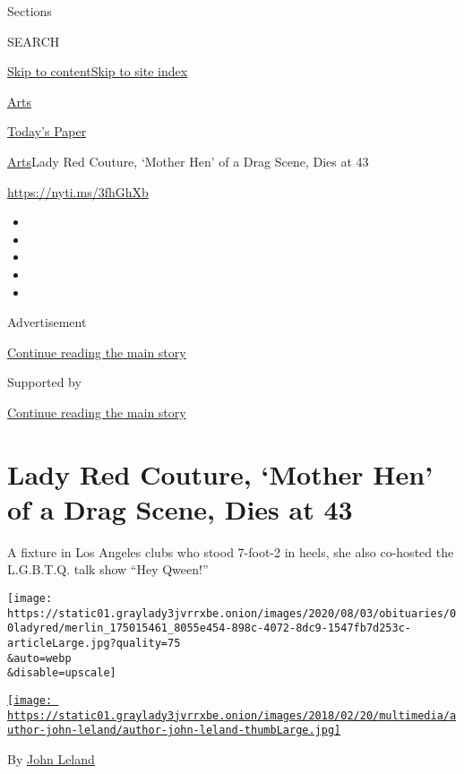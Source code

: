 Sections

SEARCH

\protect\hyperlink{site-content}{Skip to
content}\protect\hyperlink{site-index}{Skip to site index}

\href{https://www.nytimes3xbfgragh.onion/section/arts}{Arts}

\href{https://myaccount.nytimes3xbfgragh.onion/auth/login?response_type=cookie\&client_id=vi}{}

\href{https://www.nytimes3xbfgragh.onion/section/todayspaper}{Today's
Paper}

\href{/section/arts}{Arts}\textbar{}Lady Red Couture, `Mother Hen' of a
Drag Scene, Dies at 43

\url{https://nyti.ms/3fhGhXb}

\begin{itemize}
\item
\item
\item
\item
\item
\end{itemize}

Advertisement

\protect\hyperlink{after-top}{Continue reading the main story}

Supported by

\protect\hyperlink{after-sponsor}{Continue reading the main story}

\hypertarget{lady-red-couture-mother-hen-of-a-drag-scene-dies-at-43}{%
\section{Lady Red Couture, `Mother Hen' of a Drag Scene, Dies at
43}\label{lady-red-couture-mother-hen-of-a-drag-scene-dies-at-43}}

A fixture in Los Angeles clubs who stood 7-foot-2 in heels, she also
co-hosted the L.G.B.T.Q. talk show ``Hey Qween!''

\texttt{[image: https://static01.graylady3jvrrxbe.onion/images/2020/08/03/obituaries/00ladyred/merlin\_175015461\_8055e454-898c-4072-8dc9-1547fb7d253c-articleLarge.jpg?quality=75\\\&auto=webp\\\&disable=upscale]}

\href{https://www.nytimes3xbfgragh.onion/by/john-leland}{\texttt{[image: https://static01.graylady3jvrrxbe.onion/images/2018/02/20/multimedia/author-john-leland/author-john-leland-thumbLarge.jpg]}}

By \href{https://www.nytimes3xbfgragh.onion/by/john-leland}{John Leland}


